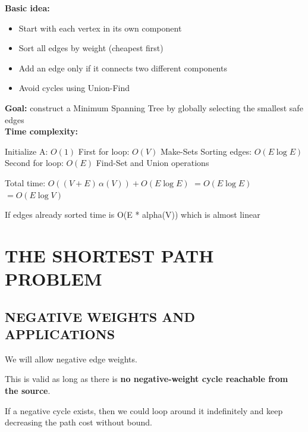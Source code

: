 \documentclass[11pt,a4paper,openany]{book}
\begin{document}
\textbf{Basic idea:}
\begin{itemize}
    \item Start with each vertex in its own component
    \item Sort all edges by weight (cheapest first)
    \item Add an edge only if it connects two different components
    \item Avoid cycles using Union-Find
\end{itemize}

\textbf{Goal:} construct a Minimum Spanning Tree by globally selecting the smallest safe edges \\

\textbf{Time complexity:}

 Initialize A: $O(1)$  
 First for loop: $O(V)$ Make-Sets  
 Sorting edges: $O(E \log E)$  
 Second for loop: $O(E)$ Find-Set and Union operations  

 Total time:  
$O((V + E)\,\alpha(V)) + O(E \log E)$  
$= O(E \log E)$  
$= O(E \log V)$

If edges already sorted time is O(E * alpha(V)) which is almost linear







\vspace{2cm}





\chapter{THE SHORTEST PATH PROBLEM}











\vspace{2cm}





\section{NEGATIVE WEIGHTS AND APPLICATIONS}






\begin{defnbox}[title=Negative Weights in Graphs]
We will allow negative edge weights.

This is valid as long as there is \textbf{no negative-weight cycle reachable from the source}.

If a negative cycle exists, then we could loop around it indefinitely and keep decreasing the path cost without bound.
\end{defnbox}
\end{document}
